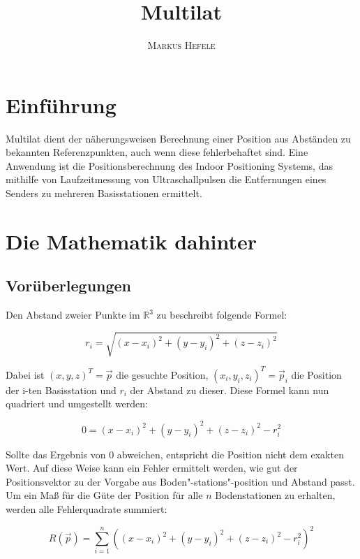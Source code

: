 \documentclass[ngerman,paper=a4,11pt]{scrartcl}
\begin{document}
\author{\textsc{Markus Hefele}}
\date{}
\title{Multilat}
\maketitle




\section{Einführung}
Multilat dient der näherungsweisen Berechnung einer Position aus Abständen zu bekannten Referenzpunkten, 
auch wenn diese fehlerbehaftet sind. Eine Anwendung ist die Positionsberechnung des Indoor Positioning Systems, das mithilfe von Laufzeitmessung von Ultraschallpulsen die Entfernungen eines Senders zu mehreren
Basisstationen ermittelt.


\section{Die Mathematik dahinter}

\subsection{Vorüberlegungen}
Den Abstand zweier Punkte im $\mathbb{R}^ 3 $ zu beschreibt folgende Formel:

\begin{equation}
r_i = \sqrt{(x-x_i)^2 + (y - y_i)^2 + (z - z_i)^2}
\end{equation}

Dabei ist $(x,y,z)^ T = \vec{p}$ die gesuchte Position, $(x_i,y_i,z_i)^ T = \vec{p}_i$ die Position der i-ten Basisstation und $r_i$ der Abstand zu dieser. Diese Formel kann nun quadriert und umgestellt werden:

\begin{equation}
0 = (x-x_i)^2 + (y - y_i)^2 + (z - z_i)^2 -r_i^2
\end{equation}

Sollte das Ergebnis von 0 abweichen, entspricht die Position nicht dem exakten Wert.
Auf diese Weise kann ein Fehler ermittelt werden, wie gut der Positionsvektor zu der Vorgabe aus Boden"-stations"-position und Abstand passt. Um ein Maß für die Güte der Position für alle $n$ Bodenstationen
zu erhalten, werden alle Fehlerquadrate summiert:

\begin{equation}
R(\vec{p}) = \sum\limits_{i=1}^n \left((x-x_i)^2 + (y - y_i)^2 + (z - z_i)^2 -r_i^2\right)^ 2
\label{residuum}
\end{equation}
\end{document}
